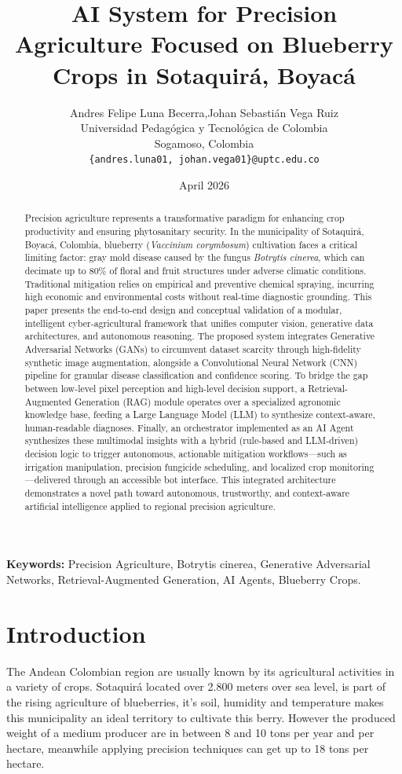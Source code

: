 \documentclass[11pt]{article}
\title{\textbf{AI System for Precision Agriculture Focused on Blueberry Crops in Sotaquirá, Boyacá}}
\author{
  Andres Felipe Luna Becerra,\quad Johan Sebasti\'{a}n Vega Ruiz \\[4pt]
  Universidad Pedag\'{o}gica y Tecnol\'{o}gica de Colombia \\
  Sogamoso, Colombia \\
  \texttt{\{andres.luna01, johan.vega01\}@uptc.edu.co}
}
\date{April 2026}
\begin{document}
\maketitle

\begin{abstract}
Precision agriculture represents a transformative paradigm for enhancing crop productivity and ensuring phytosanitary security. In the municipality of Sotaquirá, Boyacá, Colombia, blueberry (\textit{Vaccinium corymbosum}) cultivation faces a critical limiting factor: gray mold disease caused by the fungus \textit{Botrytis cinerea}, which can decimate up to 80\% of floral and fruit structures under adverse climatic conditions. Traditional mitigation relies on empirical and preventive chemical spraying, incurring high economic and environmental costs without real-time diagnostic grounding. This paper presents the end-to-end design and conceptual validation of a modular, intelligent cyber-agricultural framework that unifies computer vision, generative data architectures, and autonomous reasoning. The proposed system integrates Generative Adversarial Networks (GANs) to circumvent dataset scarcity through high-fidelity synthetic image augmentation, alongside a Convolutional Neural Network (CNN) pipeline for granular disease classification and confidence scoring. To bridge the gap between low-level pixel perception and high-level decision support, a Retrieval-Augmented Generation (RAG) module operates over a specialized agronomic knowledge base, feeding a Large Language Model (LLM) to synthesize context-aware, human-readable diagnoses. Finally, an orchestrator implemented as an AI Agent synthesizes these multimodal insights with a hybrid (rule-based and LLM-driven) decision logic to trigger autonomous, actionable mitigation workflows---such as irrigation manipulation, precision fungicide scheduling, and localized crop monitoring---delivered through an accessible bot interface. This integrated architecture demonstrates a novel path toward autonomous, trustworthy, and context-aware artificial intelligence applied to regional precision agriculture.
\end{abstract}

\textbf{Keywords:} Precision Agriculture, Botrytis cinerea, Generative Adversarial Networks, Retrieval-Augmented Generation, AI Agents, Blueberry Crops.

\section{Introduction}
The Andean Colombian region are usually known by its agricultural activities in a variety of crops. Sotaquirá located over 2.800 meters over sea level, is part of the rising agriculture of blueberries, it's soil, humidity and temperature makes this municipality an ideal territory to cultivate this berry. However the produced weight of a medium producer are in between 8 and 10 tons per year and per hectare, meanwhile applying precision techniques can get up to 18 tons per hectare.
\end{document}

